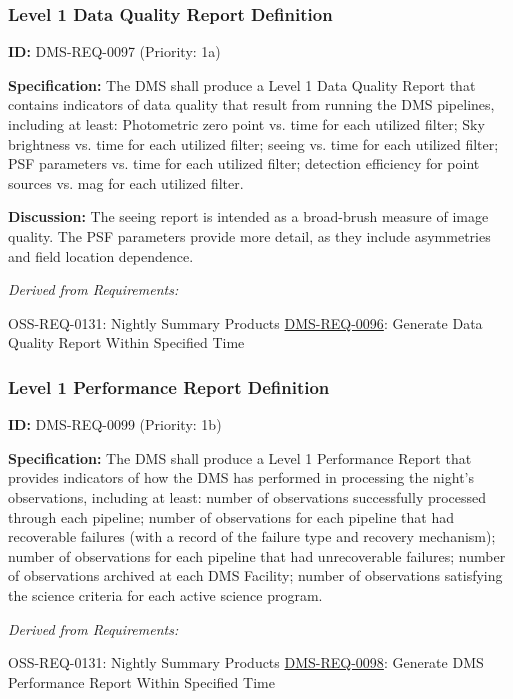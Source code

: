 \documentclass[SE,toc,lsstdraft]{lsstdoc}
\begin{document}
\subsubsection{Level 1 Data Quality Report Definition}

\label{DMS-REQ-0097}
\textbf{ID:} DMS-REQ-0097 (Priority: 1a)

\textbf{Specification:} The DMS shall produce a Level 1 Data Quality Report that contains indicators of data quality that result from running the DMS pipelines, including at least: Photometric zero point vs. time for each utilized filter; Sky brightness vs. time for each utilized filter; seeing vs. time for each utilized filter; PSF parameters vs. time for each utilized filter; detection efficiency for point sources vs. mag for each utilized filter.

\textbf{Discussion:} The seeing report is intended as a broad-brush measure of image quality.  The PSF parameters provide more detail, as they include asymmetries and field location dependence.

\emph{Derived from Requirements:}

OSS-REQ-0131:
Nightly Summary Products \newline
\hyperref[DMS-REQ-0096]{DMS-REQ-0096}:
Generate Data Quality Report Within Specified Time \newline

\subsubsection{Level 1 Performance Report Definition}

\label{DMS-REQ-0099}
\textbf{ID:} DMS-REQ-0099 (Priority: 1b)

\textbf{Specification:} The DMS shall produce a Level 1 Performance Report that provides indicators of how the DMS has performed in processing the night's observations, including at least: number of observations successfully processed through each pipeline; number of observations for each pipeline that had recoverable failures (with a record of the failure type and recovery mechanism); number of observations for each pipeline that had unrecoverable failures; number of observations archived at each DMS Facility; number of observations satisfying the science criteria for each active science program.

\emph{Derived from Requirements:}

OSS-REQ-0131:
Nightly Summary Products \newline
\hyperref[DMS-REQ-0098]{DMS-REQ-0098}:
Generate DMS Performance Report Within Specified Time \newline
\end{document}
